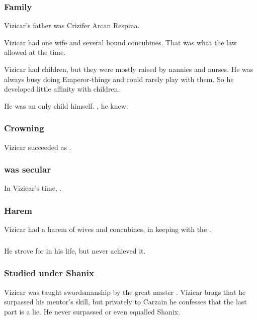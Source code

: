 \subsubsection{Family}
Vizicar's father was Crizifer Arcan Respina. 

Vizicar had one wife and several bound concubines. 
That was what the law allowed at the time. 

Vizicar had children, but they were mostly raised by nannies and nurses. 
He was always busy doing Emperor-things and could rarely play with them. 
So he developed little affinity with children. 

He was an only child himself. 
, he knew. 





\subsubsection{Crowning}
Vizicar succeeded \LucionRinOrcas{} as \VaimonCaliph. 





\subsubsection{\Delaen was secular}
In Vizicar's time, . 





\subsubsection{Harem}
Vizicar had a harem of wives and concubines, in keeping with the . 





\subsubsection{\Apotheosis}
He strove for  in his life, but never achieved it. 





\subsubsection{Studied under Shanix}
Vizicar was taught swordsmanship by the great master . 
Vizicar brags that he surpassed his mentor's skill, but privately to Carzain he confesses that the last part is a lie. 
He never surpassed or even equalled Shanix. 





